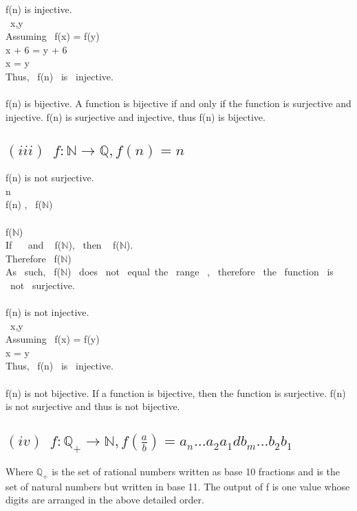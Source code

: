 \documentclass[12pt]{article}
\theoremstyle{definition}
\numberwithin{equation}{subsection}
\begin{document}
f(n) is injective.
\\ \exists \ x,y \in {}
\\ Assuming \ f(x) = f(y)
\\ x + 6 = y + 6
\\ x = y
\\ Thus, \ f(n) \ is \ injective. \\ \\

f(n) is bijective. A function is bijective if and only if the function is surjective and injective. f(n) is surjective and injective, thus f(n) is bijective.

\subsection*{$(iii) \enspace f: \mathbb{N} \to \mathbb{Q} , f(n) = n $}
f(n) is not surjective.
\\ \forall n \in {}
\\f(n) \in {}, \  f($\mathbb{N}$) \subseteq {}
\\  \in {}
\\  \notin {} \implies {} \notin f($\mathbb{N}$)
\\ If \  \in {} \ and \  \notin f($\mathbb{N}$), \ then \  \nsubseteq f($\mathbb{N}$).
\\ Therefore \ f($\mathbb{N}$) \neq {}
\\ As \ such, \ f($\mathbb{N}$) \ does \ not \ equal\ the \ range \ , \ therefore \ the \ function \ is \ not \ surjective. \\ \\

f(n) is not injective.
\\ \exists \ x,y \in {}
\\ Assuming \ f(x) = f(y)
\\ x = y
\\ Thus, \ f(n) \ is \ injective. \\ \\

f(n) is not bijective. If a function is bijective, then the function is surjective. f(n) is not surjective and thus is not bijective.

\subsection*{$(iv) \enspace f: \mathbb{Q}_{+} \to \mathbb{N} , f(\frac{a}{b}) = a_{n}...a_{2}a_{1}db_{m}...b_{2}b_{1} $}
Where $\mathbb{Q}_{+}$ is the set of rational numbers written as base 10 fractions and  is the set of natural numbers but written in base 11. The output of f is one value whose digits are arranged in the above detailed order. \\ \\
\end{document}
